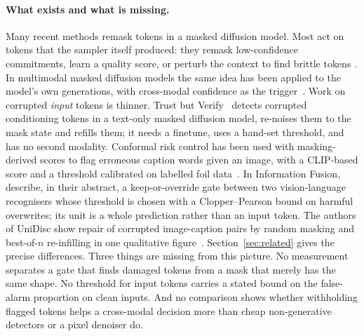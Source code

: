 \paragraph{What exists and what is missing.}
Many recent methods remask tokens in a masked diffusion model.
Most act on tokens that the sampler itself produced: they remask low-confidence commitments, learn a quality score, or
perturb the context to find brittle tokens
\citep{wang2025remdm,kim2025prism,schiff2026proseco,huang2025remedi,zhai2026core,yao2026remask,lezama2022tokencritic}.
In multimodal masked diffusion models the same idea has been applied to the model's own generations, with cross-modal
confidence as the trigger~\citep{ouyang2026freecorrection,le2026co2jump}.
Work on corrupted \emph{input} tokens is thinner.
Trust but Verify~\citep{jhingran2026trustverify} detects corrupted conditioning tokens in a text-only masked diffusion model,
re-noises them to the mask state and refills them; it needs a finetune, uses a hand-set threshold, and has no second modality.
Conformal risk control has been used with masking-derived scores to flag erroneous caption words given an image, with a
CLIP-based score and a threshold calibrated on labelled foil data~\citep{gomes2025crc}.
In Information Fusion, \citet{zhou2027burden} describe, in their abstract, a keep-or-override gate between two
vision-language recognisers whose threshold is chosen with a Clopper--Pearson bound on harmful overwrites; its unit is a whole
prediction rather than an input token.
The authors of UniDisc show repair of corrupted image-caption pairs by random masking and best-of-$n$ re-infilling in one
qualitative figure~\citep{swerdlow2025unidisc}.
Section~\ref{sec:related} gives the precise differences.
Three things are missing from this picture.
No measurement separates a gate that finds damaged tokens from a mask that merely has the same shape.
No threshold for input tokens carries a stated bound on the false-alarm proportion on clean inputs.
And no comparison shows whether withholding flagged tokens helps a cross-modal decision more than cheap non-generative
detectors or a pixel denoiser do.

